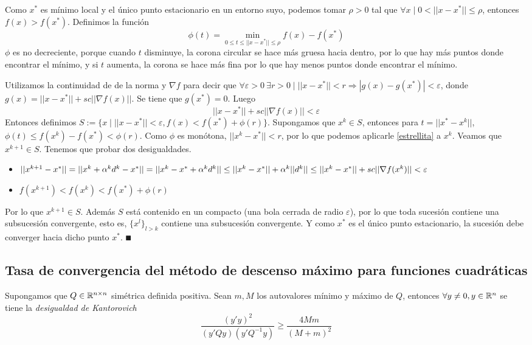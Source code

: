 \documentclass[MIOP.tex]{subfiles}
\begin{document}
\begin{dem}
Como $x^*$ es mínimo local y el único punto estacionario en un entorno suyo, podemos tomar $\rho>0$ tal que $\forall x \mid 0<||x-x^*||\leq\rho$, entonces $f(x)>f(x^*)$. Definimos la función $$\phi
(t)=\min_{0\leq t\leq ||x-x^*||\leq\rho} f(x)-f(x^*)$$
 $\phi$ es no decreciente, porque cuando $t$ disminuye, la corona circular se hace más gruesa hacia dentro, por lo que hay más puntos donde encontrar el mínimo, y si $t$ aumenta, la corona se hace más fina por lo que hay menos puntos donde encontrar el mínimo.

Utilizamos la continuidad de de la norma y $\nabla f$ para decir que $\forall \varepsilon>0\ \exists r>0\mid ||x-x^*||<r\Rightarrow |g(x)-g(x^*)|<\varepsilon$, donde $g(x)=||x-x^*||+sc||\nabla f(x)||$. Se tiene que $g(x^*)=0$. Luego
\begin{equation}\label{estrellita}
||x-x^*||+sc||\nabla f(x)||<\varepsilon 
\end{equation}
Entonces definimos $S:=\{x\mid ||x-x^*||<\varepsilon, f(x)< f(x^*)+\phi(r)\}$. Supongamos que $x^k\in S$, entonces para $t=||x^*-x^k||$, $\phi(t)\leq f(x^k)-f(x^*)<\phi(r)$. Como $\phi$ es monótona, $||x^k-x^*||<r$, por lo que podemos aplicarle \ref{estrellita} a $x^k$. Veamos que $x^{k+1}\in S$. Tenemos que probar dos desigualdades.
\begin{itemize}
\item $||x^{k+1}-x^*||=||x^k+\alpha^kd^k-x^*||=||x^k-x^*+\alpha^kd^k||\leq ||x^k-x^*||+\alpha^k||d^k||\leq\\ ||x^k-x^*||+sc||\nabla f(x^k)||<\varepsilon$
\item $f(x^{k+1})<f(x^k)<f(x^*)+\phi(r)$
\end{itemize}
Por lo que $x^{k+1}\in S$. Además $S$ está contenido en un compacto (una bola cerrada de radio $\varepsilon$), por lo que toda sucesión contiene una subsucesión convergente, esto es, $\{x^l\}_{l>k}$ contiene una subsucesión convergente. Y como $x^*$ es el único punto estacionario, la sucesión debe converger hacia dicho punto $x^*$. $\QED$
\end{dem}
\newpage
\subsection{Tasa de convergencia del método de descenso máximo para funciones cuadráticas}
Supongamos que $Q\in\mathbb{R}^{n\times n}$ simétrica definida positiva. Sean $m,M$ los autovalores mínimo y máximo de $Q$, entonces $\forall y\neq 0, y\in\mathbb{R}^n$ se tiene la \emph{desigualdad de Kantorovich}
$$\frac{(y'y)^2}{(y'Qy)(y'Q^{-1}y)}\geq\frac{4Mm}{(M+m)^2}$$
\end{document}
